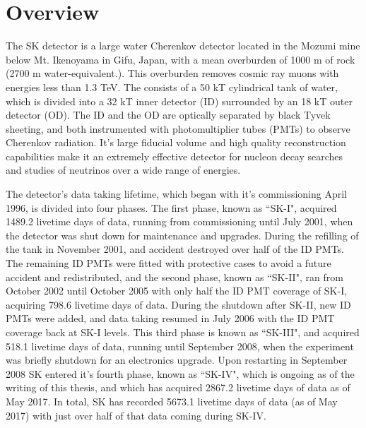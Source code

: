 \section{Overview}
\label{sec:sk_detector_overview}
The SK detector is a large water Cherenkov detector located in the Mozumi mine below Mt. Ikenoyama in Gifu, Japan, with a mean overburden of 1000 m of rock (2700 m water-equivalent.).  This overburden removes cosmic ray muons with energies less than 1.3 TeV.  The consists of a 50 kT cylindrical tank of water, which is divided into a 32 kT inner detector (ID) surrounded by an 18 kT outer detector (OD).  The ID and the OD are optically separated by black Tyvek sheeting, and both instrumented with photomultiplier tubes (PMTs) to observe Cherenkov radiation. It's large fiducial volume and high quality reconstruction capabilities make it an extremely effective detector for nucleon decay searches and studies of neutrinos over a wide range of energies. \par
The detector's data taking lifetime, which began with it's commissioning  April 1996, is divided into four phases.  The first phase, known as ``SK-I", acquired 1489.2 livetime days of data, running from commissioning until July 2001, when the detector was shut down for maintenance and upgrades.  During the refilling of the tank in November 2001, and accident destroyed over half of the ID PMTs.  The remaining ID PMTs were fitted with protective cases to avoid a future accident and redistributed, and the second phase, known as ``SK-II", ran from October 2002 until October 2005 with only half the ID PMT coverage of SK-I, acquiring 798.6 livetime days of data.  During the shutdown after SK-II, new ID PMTs were added, and data taking resumed in July 2006 with the ID PMT coverage back at SK-I levels.  This third phase is known as ``SK-III", and acquired 518.1 livetime days of data, running until September 2008, when the experiment was briefly shutdown for an electronics upgrade.  Upon restarting in September 2008 SK entered it's fourth phase, known as ``SK-IV", which is ongoing as of the writing of this thesis, and which has acquired 2867.2 livetime days of data as of May 2017.  In total, SK has recorded 5673.1 livetime days of data (as of May 2017) with just over half of that data coming during SK-IV.      